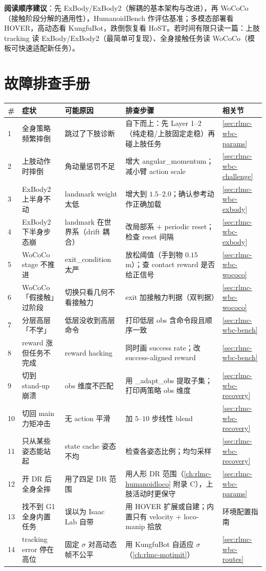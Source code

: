 \textbf{阅读顺序建议}：先 ExBody/ExBody2（解耦的基本架构与改进），再 WoCoCo（接触阶段分解的通用性），HumanoidBench 作评估基准；多模态部署看 HOVER，高动态看 KungfuBot，跌倒恢复看 HoST。若时间有限只读一篇：上肢 tracking 读 ExBody/ExBody2（最简单可复现）、全身接触任务读 WoCoCo（模板可快速适配新任务）。

\section*{故障排查手册}

\begin{center}
\small
\begin{tabular}{p{0.4cm}p{3.0cm}p{3.2cm}p{4.2cm}p{1.6cm}}
\hline
\# & 症状 & 可能原因 & 排查步骤 & 相关节 \\
\hline
1 & 全身策略频繁摔倒 & 跳过了下肢诊断 & 自下而上：先 Layer 1--2（纯走稳/上肢固定走稳）再碰上肢任务 & \cref{sec:rlmc-wbc-params} \\
2 & 上肢动作时摔倒 & 角动量惩罚不足 & 增大 angular\_momentum；减小臂 action scale & \cref{sec:rlmc-wbc-challenge} \\
3 & ExBody2 上半身不动 & landmark weight 太低 & 增大到 $1.5$--$2.0$；确认参考动作正确加载 & \cref{sec:rlmc-wbc-exbody} \\
4 & ExBody2 下半身步态崩 & landmark 在世界系（drift 耦合） & 改局部系 $+$ periodic reset；检查 reset 间隔 & \cref{sec:rlmc-wbc-exbody} \\
5 & WoCoCo stage 不推进 & exit\_condition 太严 & 放松阈值（手到物 $0.15$\,m）；查 contact reward 是否给正信号 & \cref{sec:rlmc-wbc-wococo} \\
6 & WoCoCo「假接触」过阶段 & 切换只看几何不看接触力 & exit 加接触力判据（双判据） & \cref{sec:rlmc-wbc-wococo} \\
7 & 分层高层「不学」 & 低层没收到高层命令 & 打印低层 obs 含命令段且顺序一致 & \cref{sec:rlmc-wbc-bench} \\
8 & reward 涨但任务不完成 & reward hacking & 同时画 success rate；改 success-aligned reward & \cref{sec:rlmc-wbc-bench} \\
9 & 切到 stand-up 崩溃 & obs 维度不匹配 & 用 \_adapt\_obs 提取子集；打印两策略 obs 维度 & \cref{sec:rlmc-wbc-recovery} \\
10 & 切回 main 力矩冲击 & 无 action 平滑 & 加 $5$--$10$ 步线性 blend & \cref{sec:rlmc-wbc-recovery} \\
11 & 只从某些姿态能站起 & state cache 姿态不均 & 检查各姿态比例；均匀采样 & \cref{sec:rlmc-wbc-recovery} \\
12 & 开 DR 后全身全摔 & 用了四足 DR 范围 & 用人形 DR 范围（\cref{ch:rlmc-humanoidloco} 附录 C），上肢活动时更保守 & \cref{sec:rlmc-wbc-params} \\
13 & 找不到 G1 全身内置任务 & 误以为 Isaac Lab 自带 & 用 HOVER 扩展或自建；内置只有 velocity $+$ loco-manip 拾放 & 环境配置指南 \\
14 & tracking error 停在高位 & 固定 $\sigma$ 对高动态帧不公平 & 用 KungfuBot 自适应 $\sigma$（\cref{ch:rlmc-motimit}） & \cref{sec:rlmc-wbc-routes} \\
\hline
\end{tabular}
\end{center}

